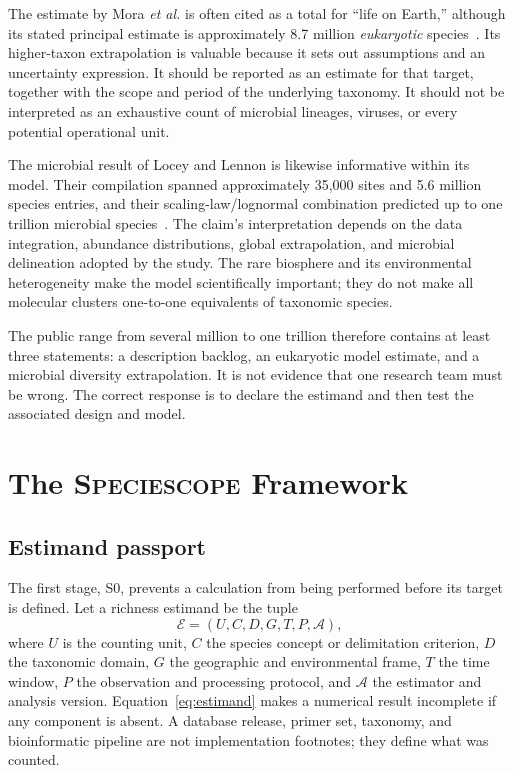\documentclass[conference]{IEEEtran}
\newcommand{\specscope}{\textsc{Speciescope}}
\begin{document}
The estimate by Mora \emph{et al.} is often cited as a total for ``life on Earth,'' although its stated principal estimate is approximately 8.7 million \emph{eukaryotic} species~\cite{mora2011}. Its higher-taxon extrapolation is valuable because it sets out assumptions and an uncertainty expression. It should be reported as an estimate for that target, together with the scope and period of the underlying taxonomy. It should not be interpreted as an exhaustive count of microbial lineages, viruses, or every potential operational unit.

The microbial result of Locey and Lennon is likewise informative within its model. Their compilation spanned approximately 35,000 sites and 5.6 million species entries, and their scaling-law/lognormal combination predicted up to one trillion microbial species~\cite{locey2016}. The claim's interpretation depends on the data integration, abundance distributions, global extrapolation, and microbial delineation adopted by the study. The rare biosphere and its environmental heterogeneity make the model scientifically important; they do not make all molecular clusters one-to-one equivalents of taxonomic species.

The public range from several million to one trillion therefore contains at least three statements: a description backlog, an eukaryotic model estimate, and a microbial diversity extrapolation. It is not evidence that one research team must be wrong. The correct response is to declare the estimand and then test the associated design and model.

\section{The \specscope{} Framework}

\subsection{Estimand passport}

The first stage, S0, prevents a calculation from being performed before its target is defined. Let a richness estimand be the tuple
\begin{equation}
\mathcal{E}=\left(U,C,D,G,T,P,\mathcal{A}\right),
\label{eq:estimand}
\end{equation}
where $U$ is the counting unit, $C$ the species concept or delimitation criterion, $D$ the taxonomic domain, $G$ the geographic and environmental frame, $T$ the time window, $P$ the observation and processing protocol, and $\mathcal{A}$ the estimator and analysis version. Equation~\eqref{eq:estimand} makes a numerical result incomplete if any component is absent. A database release, primer set, taxonomy, and bioinformatic pipeline are not implementation footnotes; they define what was counted.
\end{document}
